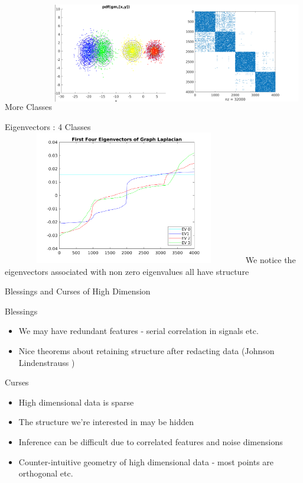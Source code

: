 \documentclass{beamer}
\begin{document}
\begin{frame}{More Classes }
\includegraphics[width=4.3in,height=2.0in]{images/mixed_4.png}
\end{frame}

\begin{frame}{Eigenvectors : 4 Classes }
\includegraphics[width=4.2in,height=2.3in]{images/eigenvecs.png}
We notice the eigenvectors associated with non zero eigenvalues all have structure
\end{frame}

\begin{frame}{Blessings and Curses  of High Dimension}
\begin{multicols}
Blessings
\begin{itemize}
\item We may have redundant features - serial correlation in signals etc.
\item Nice theorems about retaining structure after redacting data (Johnson Lindenstrauss )
\end{itemize}
\columnbreak
Curses
\begin{itemize}
\item High dimensional data is sparse
\item The structure we're interested in may be hidden
\item Inference can be difficult due to correlated features and noise dimensions 
\item Counter-intuitive geometry of high dimensional data - most points are orthogonal etc.
\end{itemize}
\end{multicols}
\end{frame}
\end{document}
